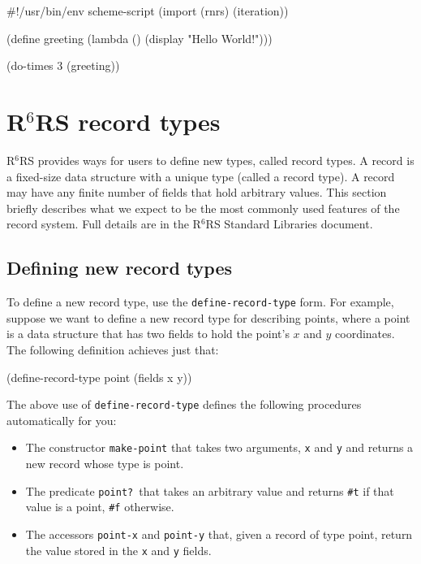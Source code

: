 \documentclass[onecolumn, 12pt, twoside, openright, dvipdfm]{book}
\newcommand{\rnrs}[1]{R$^{\mathrm{#1}}$RS}
\begin{document}
\begin{CodeInline}
#!/usr/bin/env scheme-script
(import (rnrs) (iteration))

(define greeting
  (lambda ()
    (display "Hello World!\n")))

(do-times 3 (greeting))
\end{CodeInline}

\section{\rnrs{6} record types}

\rnrs{6} provides ways for users to define new types, called record
types.  A record is a fixed-size data structure with a unique type
(called a record type).  A record may have any finite number of
fields that hold arbitrary values.  This section briefly describes
what we expect to be the most commonly used features of the record
system.  Full details are in the \rnrs{6} Standard Libraries
document\cite{r6rs:lib}.

\subsection{Defining new record types}

To define a new record type,  use the \texttt{define-record-type}
form.  For example, suppose we want to define a new record type for
describing points, where a point is a data structure that has two
fields to hold the point's $x$ and $y$ coordinates.  The following
definition achieves just that:

\begin{CodeInline}
(define-record-type point
  (fields x y))
\end{CodeInline}

The above use of \texttt{define-record-type} defines the following
procedures automatically for you:
\begin{itemize}
\item The constructor \texttt{make-point} that takes two arguments,
\texttt{x} and \texttt{y} and returns a new record whose type is
point.
\item The predicate \texttt{point?}\ that takes an arbitrary value
and returns \texttt{\#t} if that value is a point, \texttt{\#f}
otherwise. 
\item The accessors \texttt{point-x} and \texttt{point-y} that,
given a record of type point, return the value stored in the
\texttt{x} and \texttt{y} fields.
\end{itemize}
\end{document}
